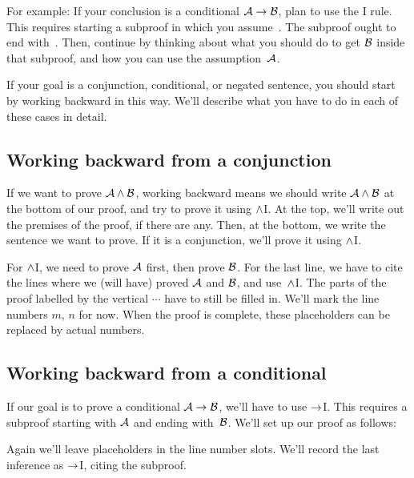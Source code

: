 For example: If your conclusion is a conditional $\mathcal{A}\rightarrow\mathcal{B}$, plan to use the {\eif}I rule. This requires starting a subproof in which you assume~. The subproof ought to end with~. Then, continue by thinking about what you should do to get $\mathcal{B}$ inside that subproof, and how you can use the assumption~$\mathcal{A}$.

If your goal is a conjunction, conditional, or negated sentence, you should start by working backward in this way. We'll describe what you have to do in each of these cases in detail.

\subsection*{Working backward from a conjunction}

If we want to prove $\mathcal{A} \wedge \mathcal{B}$, working backward means we should write $\mathcal{A} \wedge \mathcal{B}$ at the bottom of our proof, and try to prove it using $\wedge$I. At the top, we'll write out the premises of the proof, if there are any. Then, at the bottom, we write the sentence we want to prove. If it is a conjunction, we'll prove it using $\wedge$I.
  \begin{fitchproof}
	\PR
	\ellipsesline 
	\PR
\ellipsesline
    \ellipsesline 
  \end{fitchproof}
For $\wedge$I, we need to prove $\mathcal{A}$ first, then prove
$\mathcal{B}$. For the last line, we have to cite the lines where we
(will have) proved $\mathcal{A}$ and  $\mathcal{B}$, and use~$\wedge$I. The
parts of the proof labelled by the vertical $\cdots$ have to still be filled in.
We'll mark the line numbers $m$, $n$ for now. When the proof is
complete, these placeholders can be replaced by actual numbers.

\subsection*{Working backward from a conditional}

If our goal is to prove a conditional $\mathcal{A} \rightarrow \mathcal{B}$, we'll have to use $\rightarrow$I. This requires a subproof starting with $\mathcal{A}$ and ending with~$\mathcal{B}$. We'll set up our proof as follows:
\begin{fitchproof}
\open
{}
\ellipsesline 
{}
\close
{}
\end{fitchproof} 
Again we'll leave placeholders in the line number slots. We'll record the last inference as $\rightarrow$I, citing the subproof.

